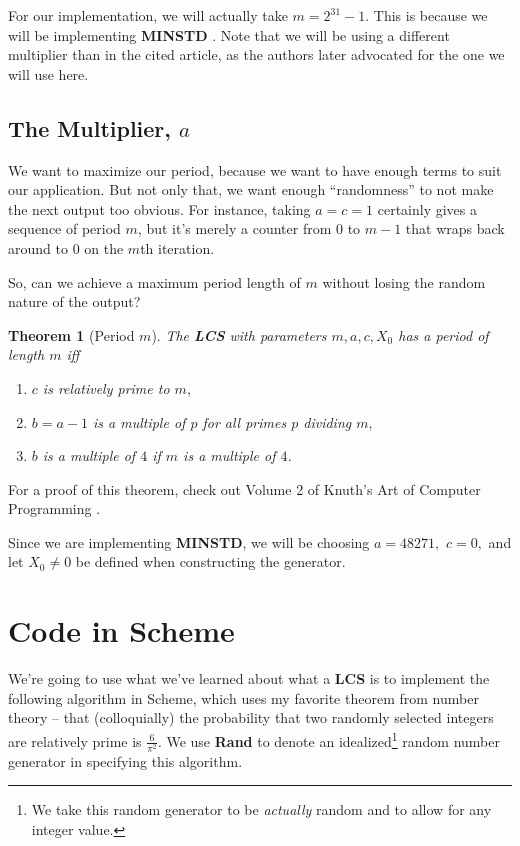 \documentclass[11pt]{article}
\newcommand{\upright}[1]{{\bf \ttfamily #1}}
\newtheorem{theorem}{Theorem}
\begin{document}
For our implementation, we will actually take $m = 2^{31} - 1$. This is because we will be implementing \upright{MINSTD} \cite{park_miller_1988}. Note that we will be using a different multiplier than in the cited article, as the authors later advocated for the one we will use here.

\subsection{The Multiplier, $a$}
We want to maximize our period, because we want to have enough terms to suit our application. But not only that, we want enough ``randomness'' to not make the next output too obvious. For instance, taking $a = c = 1$ certainly gives a sequence of period $m$, but it's merely a counter from $0$ to $m-1$ that wraps back around to $0$ on the $m$th iteration.

So, can we achieve a maximum period length of $m$ without losing the random nature of the output?

\begin{theorem}[Period $m$]
\label{thm:pm}
The \upright{LCS} with parameters $m,a,c,X_{0}$ has a period of length $m$ iff
\begin{enumerate}
\item $c$ is relatively prime to $m,$
\item $b = a - 1$ is a multiple of $p$ for all primes $p$ dividing $m,$
\item $b$ is a multiple of $4$ if $m$ is a multiple of $4$.
\end{enumerate}
\end{theorem}

For a proof of this theorem, check out Volume 2 of Knuth's Art of Computer Programming \cite{knuth_1997}.

Since we are implementing \upright{MINSTD}, we will be choosing $a = 48271,$ $c = 0,$ and let $X_{0} \neq 0$ be defined when constructing the generator.

\section{Code in Scheme}

We're going to use what we've learned about what a \upright{LCS} is to implement the following algorithm in Scheme, which uses my favorite theorem from number theory -- that (colloquially) the probability that two randomly selected integers are relatively prime is $\frac{6}{\pi^{2}}.$ We use \upright{Rand} to denote an idealized\footnote{We take this random generator to be {\it actually} random and to allow for any integer value.} random number generator in specifying this algorithm.
\end{document}
